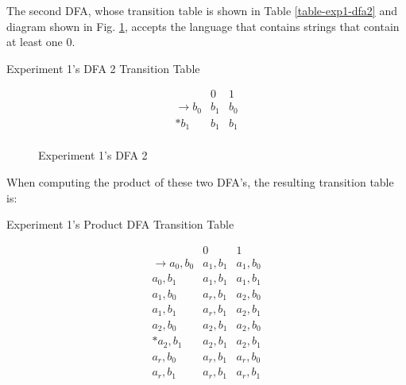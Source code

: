 \documentclass[conference]{IEEEtran}
\begin{document}
The second DFA, whose transition table is shown in Table \ref{table-exp1-dfa2} and diagram shown in Fig. \ref{fig-exp1-dfa2}, accepts the language that contains strings that contain at least one 0.

\begin{table}[h!]
    \caption{Experiment 1's DFA 2 Transition Table}
    \begin{displaymath}
        \begin{array}{r|c|c|}
        & 0 & 1 \\
        \hline
        \rightarrow b_0 & b_1 & b_0 \\
        * b_1 & b_1 & b_1 \\
        \end{array}
    \end{displaymath}
    \label{table-exp1-dfa2}
\end{table}
\begin{figure}[h!]
    \centering
    \caption{Experiment 1's DFA 2}
    \label{fig-exp1-dfa2}
\end{figure}

When computing the product of these two DFA's, the resulting transition table is:

\begin{table}[h!]
    \caption{Experiment 1's Product DFA Transition Table}
    \begin{displaymath}
        \begin{array}{r|c|c|}
        & 0 & 1 \\
        \hline
        \rightarrow a_0,b_0 & a_1,b_1 & a_1,b_0 \\
        a_0,b_1 & a_1,b_1 & a_1,b_1 \\
        a_1,b_0 & a_r,b_1 & a_2,b_0 \\
        a_1,b_1 & a_r,b_1 & a_2,b_1 \\
        a_2,b_0 & a_2,b_1 & a_2,b_0 \\
        * a_2,b_1 & a_2,b_1 & a_2,b_1 \\
        a_r,b_0 & a_r,b_1 & a_r,b_0 \\
        a_r,b_1 & a_r,b_1 & a_r,b_1 \\
        \end{array}
    \end{displaymath}
    \label{table-exp1-dfaprod}
\end{table}
\end{document}

